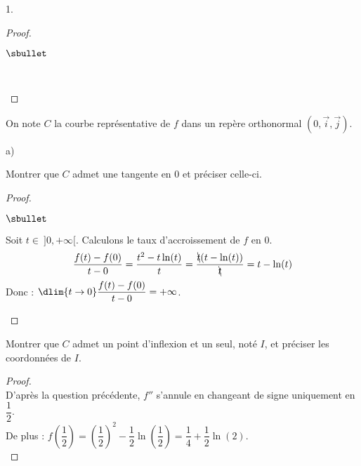 \documentclass[11pt]{article}%
\begin{document}
\begin{noliste}{1.}
\begin{proof}
\begin{noliste}{$\sbullet$}
  \begin{center}
     \end{center}~\\[-1.6cm]
 \end{noliste}
\end{proof}

\item On note $C$ la courbe représentative de $f$ dans un repère 
orthonormal $(0, \vec{i} ,\vec{j})$.
\begin{noliste}{a)}
\item Montrer que $C$ admet une tangente en $0$ et préciser celle-ci.

\begin{proof}~
 \begin{noliste}{$\sbullet$}
  \item Soit $t\in \ ]0,+\infty[$. Calculons le taux d'accroissement
  de $f$ en $0$.
  \[
   \dfrac{f(t)-f(0)}{t-0} = \dfrac{t^2-t\ln(t)}{t} = \dfrac{\bcancel{t}
   (t-\ln(t))}{\bcancel{t}} = t-\ln(t)
  \]
  Donc : $\dlim{t\to 0} \dfrac{f(t)-f(0)}{t-0} = +\infty$.%
  ~\\[-1.4cm]
 \end{noliste}
\end{proof}


\item Montrer que $C$ admet un point d'inflexion et un seul, noté $I$, 
et préciser les coordonnées de $I$.

\begin{proof}~\\
  D'après la question précédente, $f''$ s'annule en changeant de signe
  uniquement en $\dfrac{1}{2}$.\\
  De plus : $f\left(\dfrac{1}{2}\right) = \left(\dfrac{1}{2}\right)^2
  - \dfrac{1}{2}\ln\left(\dfrac{1}{2}\right) =
  \dfrac{1}{4}+\dfrac{1}{2} \ln(2)$.%
  ~\\[-1cm]
\end{proof}



\end{noliste}
\end{noliste}
\end{document}
